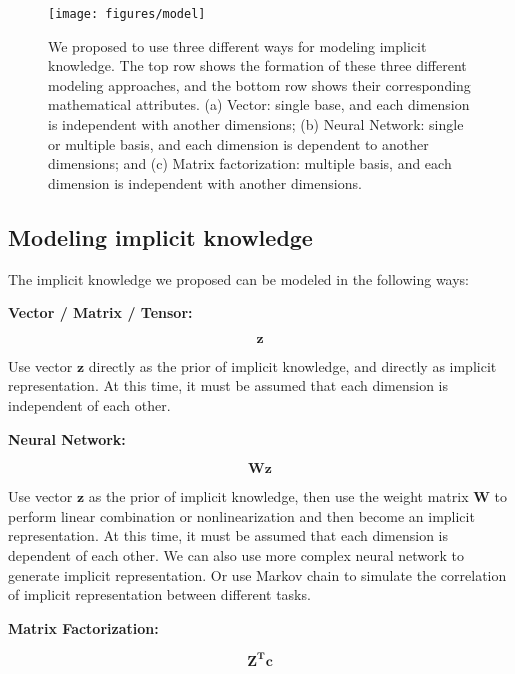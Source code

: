 \documentclass[10pt,twocolumn,letterpaper]{article}
\begin{document}
\begin{figure*}[t]
	\begin{center}
		\texttt{[image: figures/model]}
	\end{center}
	\caption{We proposed to use three different ways for modeling implicit knowledge. The top row shows the formation of these three different modeling approaches, and the bottom row shows their corresponding mathematical attributes. (a) Vector: single base, and each dimension is independent with another dimensions; (b) Neural Network: single or multiple basis, and each dimension is dependent to another dimensions; and (c) Matrix factorization: multiple basis, and each dimension is independent with another dimensions.}
	\label{fig:mod}
\end{figure*}

\newpage

\subsection{Modeling implicit knowledge}
\label{sec:mik}

The implicit knowledge we proposed can be modeled in the following ways:

\noindent
\textbf{Vector / Matrix / Tensor:}

\begin{equation}
\mathbf{z}
\end{equation}

Use vector $\mathbf{z}$ directly as the prior of implicit knowledge, and directly as implicit representation. At this time, it must be assumed that each dimension is independent of each other.

\noindent
\textbf{Neural Network:}

\begin{equation}
\mathbf{Wz}
\end{equation}

Use vector $\mathbf{z}$ as the prior of implicit knowledge, then use the weight matrix $\mathbf{W}$ to perform linear combination or nonlinearization and then become an implicit representation. At this time, it must be assumed that each dimension is dependent of each other. We can also use more complex neural network to generate implicit representation. Or use Markov chain to simulate the correlation of implicit representation between different tasks. 

\noindent
\textbf{Matrix Factorization:}

\begin{equation}
\mathbf{Z^{T}c}
\end{equation}
\end{document}
